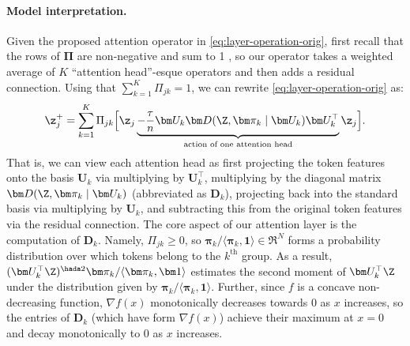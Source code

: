 \documentclass[../../book-main.tex]{subfiles}
\begin{document}
\paragraph{Model interpretation.} Given the proposed attention operator in \eqref{eq:layer-operation-orig}, first recall that the rows of $\bm\Pi$ are non-negative and sum to 1
, so our operator takes a weighted average of $K$ ``attention head''-esque operators and then adds a residual connection. Using that \(\sum_{k = 1}^{K}\Pi_{jk} = 1\), we can rewrite \eqref{eq:layer-operation-orig} as: %
\vspace{-2mm}
\begin{equation}
\label{eq:z_up}
    \z_j^+ = \sum_{k=1}^K \Pi_{jk} \Big[ \z_j \underbrace{- \frac{\tau}{n} \bm U_{k} \bm D(\Z, \bm \pi_{k} \mid \bm U_{k}) \bm U_{k}^{\top}}_{\text{action of one attention head}} \z_j \Big].
\end{equation}
That is, we can view each attention head as first projecting the token features
onto the basis $\bm U_{k}$ via multiplying by $\bm U_k^\top$, multiplying by the
diagonal matrix $\bm D(\Z, \bm \pi_{k} \mid \bm U_{k})$ (abbreviated as \(\bm
D_{k}\)), projecting back into the standard basis via multiplying by $\bm
U_{k}$, and subtracting this from the original token features via the residual
connection. The core aspect of our attention layer is the computation of $\bm
D_{k}$.  Namely, \(\Pi_{jk} \geq 0\), so $\bm \pi_k / \langle \bm \pi_{k}, \bm
1\rangle \in \Re^N$ forms a probability distribution over which tokens belong to
the $k^\text{th}$ group.  As a result, $(\bm U^\top_k \Z)^{\hada 2} \bm \pi_k / \langle \bm \pi_{k}, \bm 1\rangle$ estimates the second moment of $\bm U_k^\top \Z$ under the distribution given by $\bm \pi_k /  \langle \bm \pi_{k}, \bm 1\rangle$.  Further, since $f$ is a concave non-decreasing function, $\nabla f(x)$ monotonically decreases towards $0$ as $x$ increases, so the entries of $\bm D_{k}$ (which have form $\nabla f(x)$) achieve their maximum at $x=0$ %
and decay monotonically to $0$ as $x$ increases.
\end{document}
